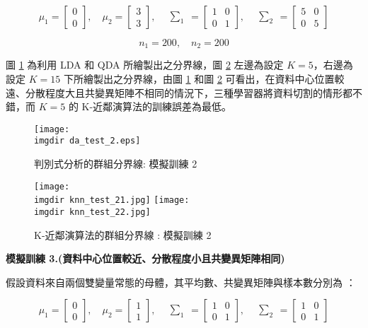 \[\mu_1 = \begin{bmatrix}
0 \\
0
\end{bmatrix}, \quad \mu_2 = \begin{bmatrix}
3 \\
3
\end{bmatrix}, \quad \begin{matrix} \sum_{1} \end{matrix} = \begin{bmatrix}
1 & 0\\
0 & 1
\end{bmatrix}, \quad \begin{matrix} \sum_{2} \end{matrix} = \begin{bmatrix}
5 & 0\\
0 & 5
\end{bmatrix}\]

\[n_1 = 200, \quad n_2 = 200\]

圖 \ref{fig:da_test_2} 為利用 LDA 和 QDA 所繪製出之分界線，圖 \ref{fig:knn_test_2} 左邊為設定 $K =5$，右邊為設定 $K = 15$ 下所繪製出之分界線，由圖 \ref{fig:da_test_2} 和圖 \ref{fig:knn_test_2} 可看出，在資料中心位置較遠、分散程度大且共變異矩陣不相同的情況下，三種學習器將資料切割的情形都不錯，而 $K = 5$ 的 K-近鄰演算法的訓練誤差為最低。
\begin{figure}[H]
    \centering
        \texttt{[image: \\imgdir da\_test\_2.eps]}
    \caption{判別式分析的群組分界線: 模擬訓練 2}
    \label{fig:da_test_2}
\end{figure}

\begin{figure}[H]
\centering
\texttt{[image: \\imgdir knn\_test\_21.jpg]}
\texttt{[image: \\imgdir knn\_test\_22.jpg]}
\caption{K-近鄰演算法的群組分界線 : 模擬訓練 2} 
\label{fig:knn_test_2}
\end{figure}

\textbf{\large 模擬訓練 3.(資料中心位置較近、分散程度小且共變異矩陣相同)}

假設資料來自兩個雙變量常態的母體，其平均數、共變異矩陣與樣本數分別為 ：

\[\mu_1 = \begin{bmatrix}
0 \\
0
\end{bmatrix}, \quad \mu_2 = \begin{bmatrix}
1 \\
1
\end{bmatrix}, \quad \begin{matrix} \sum_{1} \end{matrix} = \begin{bmatrix}
1 & 0\\
0 & 1
\end{bmatrix}, \quad \begin{matrix} \sum_{2} \end{matrix} = \begin{bmatrix}
1 & 0\\
0 & 1
\end{bmatrix}\]

